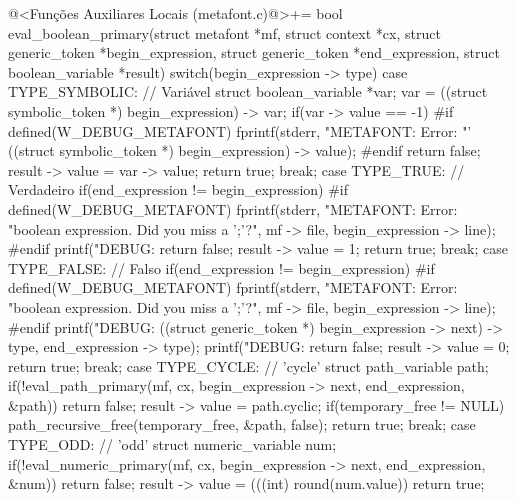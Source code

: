{{{{{{\iniciocodigo
@<Funções Auxiliares Locais (metafont.c)@>+=
bool eval_boolean_primary(struct metafont *mf, struct context *cx,
                          struct generic_token *begin_expression,
                          struct generic_token *end_expression,
                          struct boolean_variable *result){
  switch(begin_expression -> type){
    case TYPE_SYMBOLIC: // Variável
      struct boolean_variable *var;
      var = ((struct symbolic_token *) begin_expression) -> var;
      if(var -> value == -1){
#if defined(W_DEBUG_METAFONT)
        fprintf(stderr, "METAFONT: Error: %
                "'%
                ((struct symbolic_token *) begin_expression) -> value);
#endif
        return false;
      }
      result -> value = var -> value;
      return true;
    break;
    case TYPE_TRUE: // Verdadeiro
      if(end_expression != begin_expression){
#if defined(W_DEBUG_METAFONT)
        fprintf(stderr, "METAFONT: Error: %
                "boolean expression. Did you miss a ';'?\n",
                mf -> file, begin_expression -> line);
#endif
        printf("DEBUG: %
        return false;
      }
      result -> value = 1;
      return true;
    break;
    case TYPE_FALSE: // Falso
      if(end_expression != begin_expression){
#if defined(W_DEBUG_METAFONT)
        fprintf(stderr, "METAFONT: Error: %
                "boolean expression. Did you miss a ';'?\n",
                mf -> file, begin_expression -> line);
#endif
        printf("DEBUG: %
               ((struct generic_token *) begin_expression -> next) -> type,
               end_expression -> type);
        printf("DEBUG: %
        return false;
      }
      result -> value = 0;
      return true;
    break;
    case TYPE_CYCLE: // 'cycle'
      struct path_variable path;
      if(!eval_path_primary(mf, cx, begin_expression -> next, end_expression,
                            &path))
        return false;
      result -> value = path.cyclic;
      if(temporary_free != NULL)
        path_recursive_free(temporary_free, &path, false);
      return true;
    break;
    case TYPE_ODD: // 'odd'
      struct numeric_variable num;
      if(!eval_numeric_primary(mf, cx, begin_expression -> next, end_expression,
                               &num))
        return false;
      result -> value = (((int) round(num.value)) %
      return true;
}}}}}}}}
